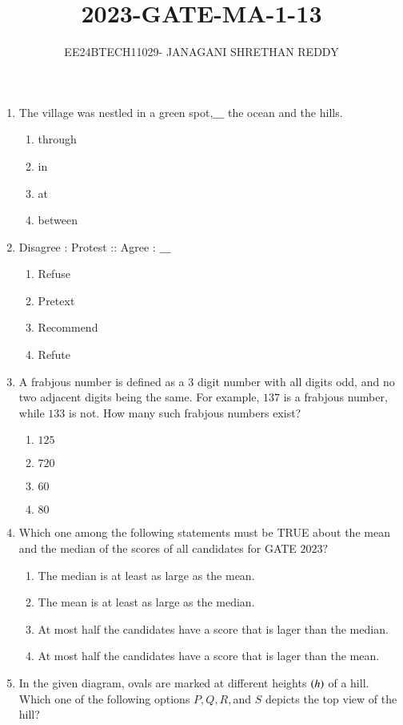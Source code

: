 \documentclass[journal]{IEEEtran}
\begin{document}
 


\vspace{3cm}

\title{2023-GATE-MA-1-13}
\author{EE24BTECH11029- JANAGANI SHRETHAN REDDY}
\maketitle{}
\bigskip
\renewcommand{\thefigure}{\theenumi}
\renewcommand{\thetable}{\theenum}
\begin{enumerate}
    \item The village was nestled in a green spot,$\_\_\_$ the ocean and the hills.
    \begin{enumerate}
        \item through
        \item in
        \item at
        \item between
    \end{enumerate}
    \item Disagree : Protest :: Agree : $\_\_\_$
    \begin{enumerate}
        \item Refuse
        \item Pretext
        \item Recommend
        \item Refute
    \end{enumerate}
    \item A frabjous number is defined as a $3$ digit number with all digits odd, and no two adjacent digits being the same. For example, $137$ is a frabjous number, while $133$ is not. How many such frabjous numbers exist?
    \begin{enumerate}
        \item $125$
        \item $720$
        \item  $60$
        \item $80$
    \end{enumerate}
    \item Which one among the following statements must be TRUE about the mean and the median of the scores of all candidates for GATE $2023?$
    \begin{enumerate}
        \item The median is at least as large as the mean.
        \item The mean is at least as large as the median.
        \item At most half the candidates have a score that is lager than the median.
        \item At most half the candidates have a score that is lager than the mean.
    \end{enumerate}
    \item In the given diagram, ovals are marked at different heights $\left(h\right)$ of a hill. Which one of the following options $P, Q, R, $and $S$ depicts the top view of the hill?


\end{enumerate}
\end{document}
